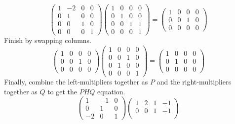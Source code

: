 \begin{example}
\begin{equation*}
\begin{pmatrix}
       1  &-2 &0  &0   \\
       0  &1  &0  &0   \\
       0  &0  &1  &0   \\
       0  &0  &0  &1
    \end{pmatrix}
    \begin{pmatrix}
       1  &0  &0  &0   \\
       0  &1  &0  &0   \\
       0  &0  &1  &1   \\
       0  &0  &0  &1
    \end{pmatrix}
  =
    \begin{pmatrix}
       1  &0  &0  &0   \\
       0  &0  &1  &0  \\
       0  &0  &0  &0
    \end{pmatrix}
\end{equation*}
Finish by swapping columns.
\begin{equation*}
    \begin{pmatrix}
       1  &0  &0  &0   \\
       0  &0  &1  &0  \\
       0  &0  &0  &0
    \end{pmatrix}
    \begin{pmatrix}
       1  &0  &0  &0   \\
       0  &0  &1  &0   \\
       0  &1  &0  &0   \\
       0  &0  &0  &1
    \end{pmatrix}
  =
    \begin{pmatrix}
       1  &0  &0  &0   \\
       0  &1  &0  &0  \\
       0  &0  &0  &0
    \end{pmatrix}
\end{equation*}
Finally, combine the left-multipliers together as $P$ and the
right-multipliers together as $Q$ to get the $PHQ$ equation.
\begin{equation*}
    \begin{pmatrix}
       1  &-1 &0    \\
       0  &1  &0    \\
       -2 &0  &1
    \end{pmatrix}
    \begin{pmatrix}
       1  &2  &1  &-1  \\
       0  &0  &1  &-1  \\

\end{pmatrix}
\end{equation*}
\end{example}
